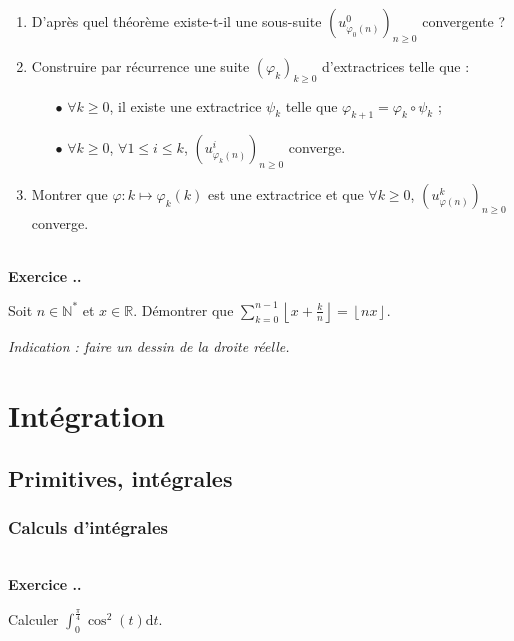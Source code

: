 \documentclass{article}
\newcommand{\di}{\mathrm{d}}
\newcommand{\mb}[1]{\mathbb{#1}}
\newcounter{exo}
\newcommand{\exercice}[1][\null]{\textbf{\\ Exercice \thesection.\theexo. #1} \addtocounter{exo}{1}}
\begin{document}
\begin{enumerate}

\item D'après quel théorème existe-t-il une sous-suite $\left(u^0_{\varphi_0(n)}\right)_{n \ge 0}$ convergente ?

\item Construire par récurrence une suite $(\varphi_k)_{k \ge 0}$ d'extractrices telle que :

\begin{itemize}

\item[$\bullet$] $\forall k \ge 0$, il existe une extractrice $\psi_k$ telle que $\varphi_{k+1} = \varphi_k \circ \psi_k$ ;

\item[$\bullet$] $\forall k \ge 0$, $\forall 1 \le i \le k$, $\left(u^i_{\varphi_k(n)}\right)_{n \ge 0}$ converge.

\end{itemize}

\item Montrer que $\varphi : k \mapsto \varphi_k(k)$ est une extractrice et que $\forall k \ge 0$, $\left(u^k_{\varphi(n)}\right)_{n \ge 0}$ converge.


\end{enumerate}


\exercice

Soit $n \in \mb{N^*}$ et $x \in \mb{R}$. Démontrer que $\displaystyle \sum_{k=0}^{n-1} \left\lfloor x + \frac{k}{n}\right\rfloor = \left\lfloor nx \right\rfloor$.

\emph{Indication : faire un dessin de la droite réelle.}


\section{Intégration}

\subsection{Primitives, intégrales}

\subsubsection{Calculs d'intégrales}

\exercice

Calculer $\displaystyle \int_{0}^{\frac{\pi}{4}} \cos^2(t) \di t$.
\end{document}
